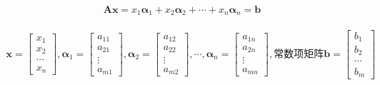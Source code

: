 \documentclass[12pt]{book}
\begin{document}
\begin{gather*}
    \mathbf{A}\mathbf{x} = x_1\bm{\alpha}_1 +x_2\bm{\alpha}_2+\cdots + x_n\bm{\alpha}_n= \bm{b}
\end{gather*}

\begin{gather*}
    \mathbf{x} = \begin{bmatrix}
        x_1\\x_2\\\cdots\\x_n
    \end{bmatrix}, 
    \bm{\alpha}_1 = \begin{bmatrix}
        a_{11}\\a_{21}\\\vdots\\a_{m1}
    \end{bmatrix},
    \bm{\alpha}_2 = \begin{bmatrix}
        a_{12}\\a_{22}\\\vdots\\a_{m2}
    \end{bmatrix},\cdots,
    \bm{\alpha}_n = \begin{bmatrix}
        a_{1n}\\a_{2n}\\\vdots\\a_{mn}
    \end{bmatrix}
    ,\text{常数项矩阵}
    \mathbf{b} = \begin{bmatrix}
        b_1 \\ b_2 \\ \cdots \\ b_m
    \end{bmatrix}
\end{gather*}
\end{document}
